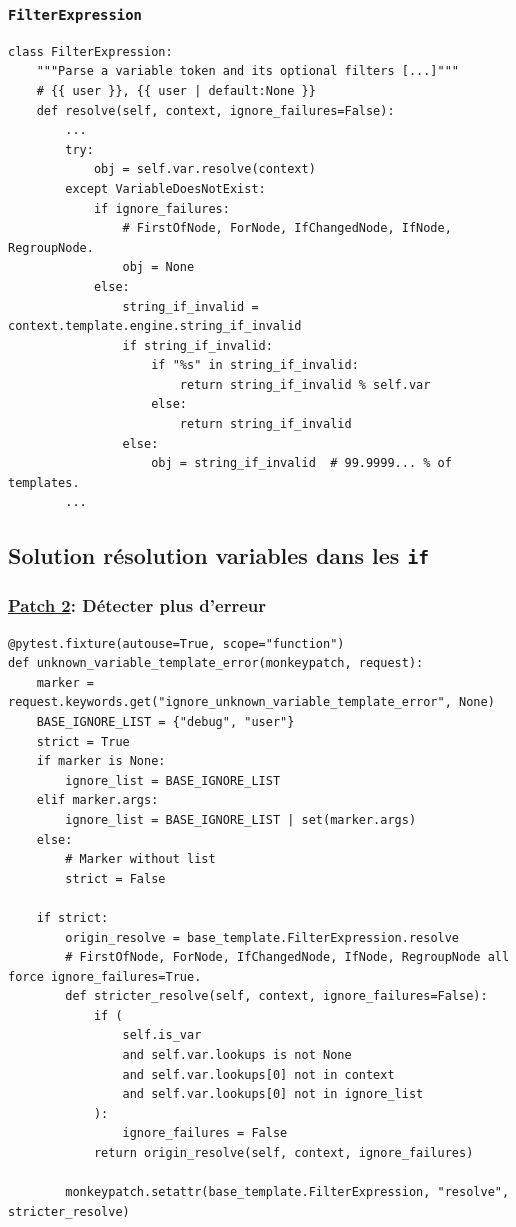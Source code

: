 \documentclass{beamer}
\begin{document}
\begin{frame}[fragile]
    \frametitle{\texttt{FilterExpression}}

    \begin{verbatim}
class FilterExpression:
    """Parse a variable token and its optional filters [...]"""
    # {{ user }}, {{ user | default:None }}
    def resolve(self, context, ignore_failures=False):
        ...
        try:
            obj = self.var.resolve(context)
        except VariableDoesNotExist:
            if ignore_failures:
                # FirstOfNode, ForNode, IfChangedNode, IfNode, RegroupNode.
                obj = None
            else:
                string_if_invalid = context.template.engine.string_if_invalid
                if string_if_invalid:
                    if "%s" in string_if_invalid:
                        return string_if_invalid % self.var
                    else:
                        return string_if_invalid
                else:
                    obj = string_if_invalid  # 99.9999... % of templates.
        ...
    \end{verbatim}
\end{frame}

\subsection*{Solution résolution variables dans les \texttt{if}}

\begin{frame}[fragile]
    \frametitle{\href{https://github.com/gip-inclusion/les-emplois/blob/2ccc5db10f07c6049c66a96f5fe57ad6715bdc91/tests/conftest.py\#L320-L350}{Patch 2}: Détecter plus d'erreur}

    \begin{verbatim}
@pytest.fixture(autouse=True, scope="function")
def unknown_variable_template_error(monkeypatch, request):
    marker = request.keywords.get("ignore_unknown_variable_template_error", None)
    BASE_IGNORE_LIST = {"debug", "user"}
    strict = True
    if marker is None:
        ignore_list = BASE_IGNORE_LIST
    elif marker.args:
        ignore_list = BASE_IGNORE_LIST | set(marker.args)
    else:
        # Marker without list
        strict = False

    if strict:
        origin_resolve = base_template.FilterExpression.resolve
        # FirstOfNode, ForNode, IfChangedNode, IfNode, RegroupNode all force ignore_failures=True.
        def stricter_resolve(self, context, ignore_failures=False):
            if (
                self.is_var
                and self.var.lookups is not None
                and self.var.lookups[0] not in context
                and self.var.lookups[0] not in ignore_list
            ):
                ignore_failures = False
            return origin_resolve(self, context, ignore_failures)

        monkeypatch.setattr(base_template.FilterExpression, "resolve", stricter_resolve)
    \end{verbatim}
\end{frame}
\end{document}
